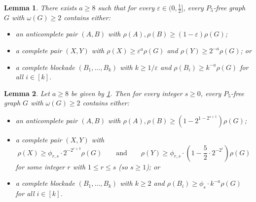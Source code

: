 \documentclass[10pt,a4paper]{amsart}
\newtheorem{lemma}{Lemma}
\newcommand{\eps}{\varepsilon}
\begin{document}
	\begin{lemma}
		\label{lem:1step}
		There exists $a\ge8$ such that for every $\eps\in(0,\frac12]$, every $P_5$-free graph $G$ with $\omega(G)\ge2$ contains either:
		\begin{itemize}
			\item an anticomplete pair $(A,B)$ with $\rho(A),\rho(B)\ge(1-\eps)\rho(G)$;
			
			\item a complete pair $(X,Y)$ with $\rho(X)\ge\eps^a\rho(G)$ and $\rho(Y)\ge2^{-a}\rho(G)$; or
			
			\item a complete blockade $(B_1,\ldots,B_k)$ with $k\ge1/\eps$ and $\rho(B_i)\ge k^{-a}\rho(G)$ for all $i\in[k]$.
		\end{itemize}
	\end{lemma}

	\begin{lemma}
		\label{lem:incrho}
		Let $a\ge8$ be given by \cref{lem:1step}. Then for every integer $s\ge0$, every $P_5$-free graph $G$ with $\omega(G)\ge2$ contains either:
		\begin{itemize}
			\item an anticomplete pair $(A,B)$ with $\rho(A),\rho(B)\ge(1-2^{1-2^{s+1}})\rho(G)$;
			
			\item a complete pair $(X,Y)$ with
			$$\rho(X)\ge \phi_{r,s}\cdot2^{-2^{r+3}}\rho(G)
			\qquad\text{and}\qquad
			\rho(Y)\ge \phi_{r,s}\cdot\left(1-\frac52\cdot2^{-2^{r}}\right)\rho(G)$$
			for some integer $r$ with $1\le r\le s$ (so $s\ge1$); or
			
			\item a complete blockade $(B_1,\ldots,B_k)$ with $k\ge2$ and $\rho(B_i)\ge \phi_s\cdot k^{-a}\rho(G)$ for all $i\in[k]$.
		\end{itemize}
	\end{lemma}
\end{document}
